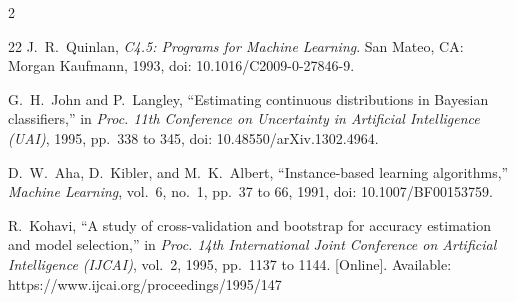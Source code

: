 \documentclass[journal,onecolumn]{IEEEtran}
\begin{document}
\begin{multicols}{2}
\begin{thebibliography}{22}
J.~R.~Quinlan, \emph{C4.5: Programs for Machine Learning}. San Mateo, CA: Morgan Kaufmann, 1993, doi: 10.1016/C2009-0-27846-9.

G.~H.~John and P.~Langley, ``Estimating continuous distributions in Bayesian classifiers,'' in \emph{Proc. 11th Conference on Uncertainty in Artificial Intelligence (UAI)}, 1995, pp.~338 to 345, doi: 10.48550/arXiv.1302.4964.

D.~W.~Aha, D.~Kibler, and M.~K.~Albert, ``Instance-based learning algorithms,'' \emph{Machine Learning}, vol.~6, no.~1, pp.~37 to 66, 1991, doi: 10.1007/BF00153759.

R.~Kohavi, ``A study of cross-validation and bootstrap for accuracy estimation and model selection,'' in \emph{Proc. 14th International Joint Conference on Artificial Intelligence (IJCAI)}, vol.~2, 1995, pp.~1137 to 1144. [Online]. Available: https://www.ijcai.org/proceedings/1995/147

\end{thebibliography}
\end{multicols}
\endgroup
\end{document}
